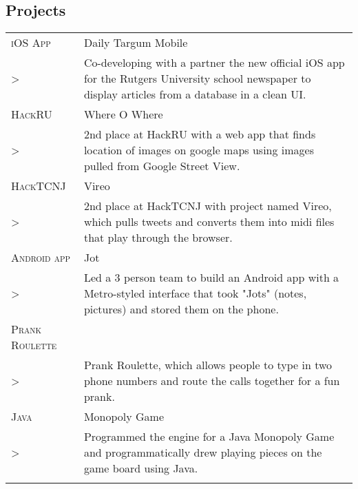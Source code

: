 \documentclass[a4paper, oneside, final]{scrartcl} %
\newcommand{\gray}{\rowcolor[gray]{.90}} %
\begin{document}
\begin{center}


\section{Projects}

\begin{tabularx}{0.97\linewidth}{>{\raggedleft\scshape}p{2.7cm}X}
    \gray iOS App & Daily Targum Mobile\\
  >& Co-developing with a partner the new official iOS app for the Rutgers University school newspaper to display articles from a database in a clean UI. \\
    \gray HackRU & Where O Where \\
  >& 2nd place at HackRU with a web app that finds location of images on google maps using images pulled from Google Street View. \\
\gray HackTCNJ & Vireo\\
  >& 2nd place at HackTCNJ with project named Vireo, which pulls tweets and converts them into midi files that play through the browser.\\
\gray Android app & Jot\\
  >& Led a 3 person team to build an Android app with a Metro-styled interface that took "Jots" (notes, pictures) and stored them on the phone. \\
\gray Prank Roulette & \\
  >& Prank Roulette, which allows people to type in two phone numbers and route the calls together for a fun prank. \\
\gray Java & Monopoly Game\\
  >& Programmed the engine for a Java Monopoly Game and programmatically drew playing pieces on the game board using Java. \\ \\
\end{tabularx}



\end{center}
\end{document}
